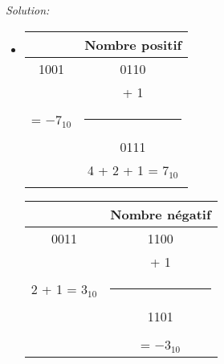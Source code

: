 \documentclass{article}
\newenvironment{solution}
    {\textit{Solution:}}
    {}
\begin{document}
\begin{solution}
\begin{itemize}
        \item
        
        
        \begin{tabular}{|c|c|}
        \hline
         & Nombre positif\\
        \hline    
        1001                &       0110                        \\
        \hspace{101pt}      &       + \hspace{5pt} 1           \\
        = $-7_{10}$          &       \rule{1in}{1pt}             \\
        \hspace{5pt}        &       0111                        \\
        \hspace{5pt}        &       4 + 2 + 1 = $7_{10}$        \\
                            &       \hspace{100pt}              \\
        \hline
        \end{tabular}
        
        \hspace{40pt}
        
        \begin{tabular}{|c|c|}
        \hline
        & Nombre négatif\\
        \hline    
        0011                        &       1100                \\
                                    &       + \hspace{5pt} 1   \\
        2 + 1 = $3_{10}$            &       \rule{1in}{1pt}     \\
        \hspace{5pt}                &       1101                \\
        \hspace{100pt}              &       \hspace{100pt}      \\
                                    &       = $-3_{10}$          \\
        \hline
        \end{tabular}
        
        \hspace{40pt}
        

\end{itemize}
\end{solution}
\end{document}
